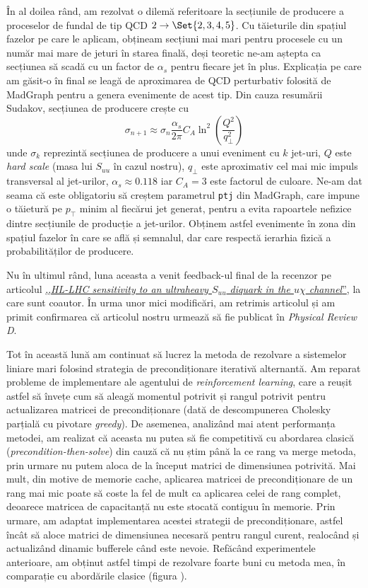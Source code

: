 În al doilea rând, am rezolvat o dilemă referitoare la secțiunile de producere a proceselor de fundal de tip QCD \(2 \rightarrow \Set{2, 3, 4, 5}\). Cu tăieturile din spațiul fazelor pe care le aplicam, obțineam secțiuni mai mari pentru procesele cu un număr mai mare de jeturi în starea finală, deși teoretic ne-am aștepta ca secțiunea să scadă cu un factor de \(\alpha_s\) pentru fiecare jet în plus. Explicația pe care am găsit-o în final se leagă de aproximarea de QCD perturbativ folosită de MadGraph pentru a genera evenimente de acest tip. Din cauza resumării Sudakov, secțiunea de producere crește cu
\[
    \sigma_{n+1} \approx \sigma_{n} \frac{\alpha_s}{2 \pi} C_A \ln^2 \left(\frac{Q^2}{q_{\perp}^2}\right)
\]
unde \(\sigma_k\) reprezintă secțiunea de producere a unui eveniment cu \(k\) jet-uri, \(Q\) este \textit{hard scale} (masa lui \(S_{uu}\) în cazul nostru), \(q_{\perp}\) este aproximativ cel mai mic impuls transversal al jet-urilor, \(\alpha_s \approx 0.118\) iar \(C_A = 3\) este factorul de culoare. Ne-am dat seama că este obligatoriu să creștem parametrul \texttt{ptj} din MadGraph, care impune o tăietură pe \(p_{\intercal}\) minim al fiecărui jet generat, pentru a evita rapoartele nefizice dintre secțiunile de producție a jet-urilor. Obținem astfel evenimente în zona din spațiul fazelor în care se află și semnalul, dar care respectă ierarhia fizică a probabilităților de producere.

Nu în ultimul rând, luna aceasta a venit feedback-ul final de la recenzor pe articolul \href{https://arxiv.org/abs/2601.11181}{,,\textit{HL-LHC sensitivity to an ultraheavy \(S_{uu}\) diquark in the \(u\chi\) channel}''}, la care sunt coautor. În urma unor mici modificări, am retrimis articolul și am primit confirmarea că articolul nostru urmează să fie publicat în \emph{Physical Review D}.

Tot în această lună am continuat să lucrez la metoda de rezolvare a sistemelor liniare mari folosind strategia de precondiționare iterativă alternantă. Am reparat probleme de implementare ale agentului de \textit{reinforcement learning}, care a reușit astfel să învețe cum să aleagă momentul potrivit și rangul potrivit pentru actualizarea matricei de precondiționare (dată de descompunerea Cholesky parțială cu pivotare \textit{greedy}). De asemenea, analizând mai atent performanța metodei, am realizat că aceasta nu putea să fie competitivă cu abordarea clasică (\textit{precondition-then-solve}) din cauză că nu știm până la ce rang va merge metoda, prin urmare nu putem aloca de la început matrici de dimensiunea potrivită. Mai mult, din motive de memorie cache, aplicarea matricei de precondiționare de un rang mai mic poate să coste la fel de mult ca aplicarea celei de rang complet, deoarece matricea de capacitanță nu este stocată contiguu în memorie. Prin urmare, am adaptat implementarea acestei strategii de precondiționare, astfel încât să aloce matrici de dimensiunea necesară pentru rangul curent, realocând și actualizând dinamic bufferele când este nevoie. Refăcând experimentele anterioare, am obținut astfel timpi de rezolvare foarte buni cu metoda mea, în comparație cu abordările clasice (figura ).

